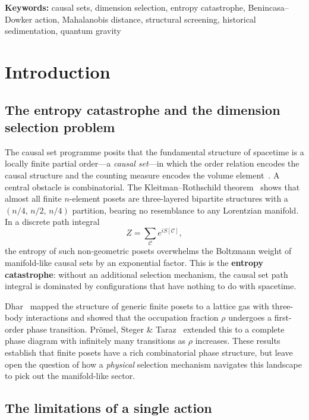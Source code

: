 \documentclass[12pt,a4paper]{article}
\begin{document}
\noindent\textbf{Keywords:}
causal sets, dimension selection, entropy catastrophe, Benincasa--Dowker action,
Mahalanobis distance, structural screening, historical sedimentation,
quantum gravity

\section{Introduction}
\label{sec:intro}

\subsection{The entropy catastrophe and the dimension selection problem}

The causal set programme posits that the fundamental structure of spacetime is a
locally finite partial order---a \emph{causal set}---in which the order relation
encodes the causal structure and the counting measure encodes the volume
element~\cite{Bombelli1987}.
A central obstacle is combinatorial.
The Kleitman--Rothschild theorem~\cite{KleitmanRothschild1975} shows that almost
all finite $n$-element posets are three-layered bipartite structures with a
$(n/4,\,n/2,\,n/4)$ partition, bearing no resemblance to any Lorentzian manifold.
In a discrete path integral
\begin{equation}
  Z = \sum_{\mathcal{C}} e^{iS[\mathcal{C}]},
\end{equation}
the entropy of such non-geometric posets overwhelms the Boltzmann weight of
manifold-like causal sets by an exponential factor.
This is the \textbf{entropy catastrophe}: without an additional selection
mechanism, the causal set path integral is dominated by configurations that have
nothing to do with spacetime.

Dhar~\cite{Dhar1978} mapped the structure of generic finite posets to a lattice
gas with three-body interactions and showed that the occupation fraction $\rho$
undergoes a first-order phase transition.
Pr\"omel, Steger \& Taraz~\cite{Proemel2001} extended this to a complete phase
diagram with infinitely many transitions as $\rho$ increases.
These results establish that finite posets have a rich combinatorial phase
structure, but leave open the question of how a \emph{physical} selection
mechanism navigates this landscape to pick out the manifold-like sector.

\subsection{The limitations of a single action}
\end{document}
